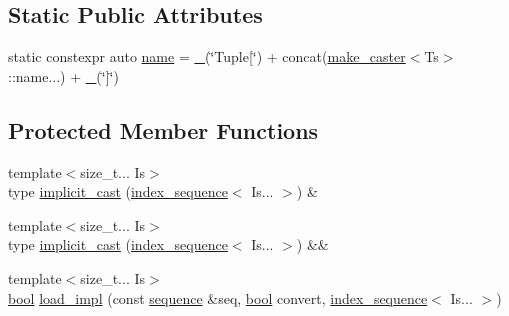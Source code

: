 \subsection*{Static Public Attributes}
\begin{DoxyCompactItemize}
\item 
static constexpr auto \mbox{\hyperlink{classtuple__caster_ac5732f181ed863ea77052affd48e33a0}{name}} = \mbox{\hyperlink{descr_8h_af114703e20c6527e87163eb2798f74b8}{\+\_\+}}(\char`\"{}Tuple\mbox{[}\char`\"{}) + concat(\mbox{\hyperlink{cast_8h_ab32b52411a6b07420516d79074815713}{make\+\_\+caster}}$<$Ts$>$\+::name...) + \mbox{\hyperlink{descr_8h_af114703e20c6527e87163eb2798f74b8}{\+\_\+}}(\char`\"{}\mbox{]}\char`\"{})
\end{DoxyCompactItemize}
\subsection*{Protected Member Functions}
\begin{DoxyCompactItemize}
\item 
{\footnotesize template$<$size\+\_\+t... Is$>$ }\\type \mbox{\hyperlink{classtuple__caster_a9f833c2141a2bd5d3ae2625752436aba}{implicit\+\_\+cast}} (\mbox{\hyperlink{structindex__sequence}{index\+\_\+sequence}}$<$ Is... $>$) \&
\item 
{\footnotesize template$<$size\+\_\+t... Is$>$ }\\type \mbox{\hyperlink{classtuple__caster_a3101ab61e84c97fd09104355e095b491}{implicit\+\_\+cast}} (\mbox{\hyperlink{structindex__sequence}{index\+\_\+sequence}}$<$ Is... $>$) \&\&
\item 
{\footnotesize template$<$size\+\_\+t... Is$>$ }\\\mbox{\hyperlink{asdl_8h_af6a258d8f3ee5206d682d799316314b1}{bool}} \mbox{\hyperlink{classtuple__caster_a86bacf2d7f440d7cc2f42620c9622f19}{load\+\_\+impl}} (const \mbox{\hyperlink{classsequence}{sequence}} \&seq, \mbox{\hyperlink{asdl_8h_af6a258d8f3ee5206d682d799316314b1}{bool}} convert, \mbox{\hyperlink{structindex__sequence}{index\+\_\+sequence}}$<$ Is... $>$)
\end{DoxyCompactItemize}
